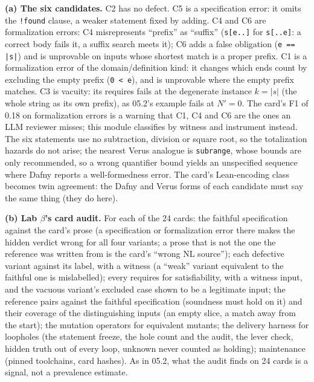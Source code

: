 \documentclass[11pt]{article}
\begin{document}
\begin{answer}
\textbf{(a) The six candidates.} C2 has no defect. C5 is a specification
error: it omits the \texttt{!found} clause, a weaker statement fixed by adding.
C4 and C6 are formalization errors: C4 misrepresents ``prefix'' as
``suffix'' (\texttt{s[e..]} for \texttt{s[..e]}: a correct body fails it, a
suffix search meets it); C6 adds a false obligation (\texttt{e == |s|}) and is
unprovable on inputs whose shortest match is a proper prefix. C1 is a
formalization error of the domain/definition kind: it changes which ends
count by excluding the empty prefix (\texttt{0 < e}), and is unprovable where
the empty prefix matches. C3 is vacuity: its requires fails at the degenerate
instance $k=|s|$ (the whole string as its own prefix), as 05.2's example fails
at $N'=0$. The card's F1 of 0.18 on formalization errors is a warning that C1,
C4 and C6 are the ones an LLM reviewer misses; this module classifies by
witness and instrument instead.
The six statements use no subtraction, division or square root, so the
totalization hazards do not arise; the nearest Verus analogue is
\texttt{subrange}, whose bounds are only recommended, so a wrong quantifier
bound yields an unspecified sequence where Dafny reports a well-formedness
error. The card's Lean-encoding class becomes twin agreement: the Dafny and
Verus forms of each candidate must say the same thing (they do here).

\textbf{(b) Lab $\beta$'s card audit.} For each of the 24 cards: the faithful
specification against the card's prose (a specification or formalization
error there makes the hidden verdict wrong for all four variants; a prose that
is not the one the reference was written from is the card's ``wrong NL
source''); each defective variant against its label, with a witness (a
``weak'' variant equivalent to the faithful one is mislabelled); every
requires for satisfiability, with a witness input, and the vacuous variant's
excluded case shown to be a legitimate input; the reference pairs against the
faithful specification (soundness must hold on it) and their coverage of the
distinguishing inputs (an empty slice, a match away from the start); the
mutation operators for equivalent mutants; the delivery harness for loopholes
(the statement freeze, the hole count and the audit, the lever check, hidden
truth out of every loop, unknown never counted as holding); maintenance
(pinned toolchains, card hashes). As in 05.2, what the audit finds on 24 cards
is a signal, not a prevalence estimate.


\end{answer}
\end{document}
